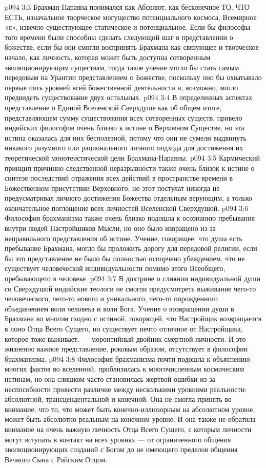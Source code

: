 \vs p094 3:3 Брахман\hyp{}Нараяна понимался как Абсолют, как бесконечное ТО, ЧТО ЕСТЬ, изначальное творческое могущество потенциального космоса, Всемирное «я», извечно существующее\hyp{}статическое и потенциальное. Если бы философы того времени были способны сделать следующий шаг в представлении о божестве, если бы они смогли воспринять Брахмана как связующее и творческое начало, как личность, которая может быть доступна сотворенным эволюционирующим существам, тогда такое учение могло бы стать самым передовым на Урантии представлением о Божестве, поскольку оно бы охватывало первые пять уровней всей божественной деятельности и, возможно, могло предвидеть существование двух остальных.
\vs p094 3:4 В определенных аспектах представление о Единой Вселенской Сверхдуше как об общем итоге, представляющем сумму существования всех сотворенных существ, привело индийских философов очень близко к истине о Верховном Существе, но эта истина оказалась для них бесполезной, потому что они не сумели выдвинуть никакого разумного или рационального личного подхода для достижения их теоретической монотеистической цели Брахмана\hyp{}Нараяны.
\vs p094 3:5 Кармический принцип причинно\hyp{}следственной неразрывности также очень близок к истине о синтезе последствий отражения всех действий в пространстве\hyp{}времени в Божественном присутствии Верховного; но этот постулат никогда не предусматривал личного достижения Божества отдельным верующим, а только окончательное поглощение всех личностей Вселенской Сверхдушой.
\vs p094 3:6 Философия брахманизма также очень близко подошла к осознанию пребывания внутри людей Настройшиков Мысли, но оно было извращено из\hyp{}за неправильного представления об истине. Учение, говорящее, что душа есть пребывание Брахмана, могло бы проложить дорогу для передовой религии, если бы это представление не было бы полностью испорчено убеждением, что не существует человеческой индивидуальности помимо этого Всеобщего, пребывающего в человеке.
\vs p094 3:7 В доктрине о слиянии индивидуальной души со Сверхдушой индийские теологи не смогли предусмотреть выживание чего\hyp{}то человеческого, чего\hyp{}то нового и уникального, чего\hyp{}то порожденного объединением воли человека и воли Бога. Учение о возвращении души в Брахмана во многом сходно с истиной, говорящей, что Настройщик возвращается в лоно Отца Всего Сущего, но существует нечто отличное от Настройщика, которое тоже выживает, --- моронтийный двойник смертной личности. И это жизненно важное представление, роковым образом, отсутствует в философии брахманизма.
\vs p094 3:8 Философия брахманизма почти подошла к объяснению многих фактов во вселенной, приблизилась к многочисленным космическим истинам, но она слишком часто становилась жертвой ошибки из\hyp{}за неспособности провести различие между несколькими уровнями реальности: абсолютной, трансцендентальной и конечной. Она не смогла принять во внимание, что то, что может быть конечно\hyp{}иллюзорным на абсолютном уровне, может быть абсолютно реальным на конечном уровне. И она также не обратила внимание на очень важную личность Отца Всего Сущего, с которым личности могут вступать в контакт на всех уровнях --- от ограниченного общения эволюционирующих созданий с Богом до не имеющего пределов общения Вечного Сына с Райским Отцом.

